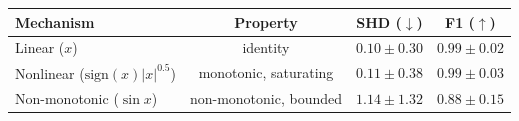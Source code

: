 \begin{tabular}{lccc}
\toprule
Mechanism & Property & SHD ($\downarrow$) & F1 ($\uparrow$) \\
\midrule
Linear ($x$) & identity & $0.10 \pm 0.30$ & $0.99 \pm 0.02$ \\
Nonlinear ($\text{sign}(x)|x|^{0.5}$) & monotonic, saturating & $0.11 \pm 0.38$ & $0.99 \pm 0.03$ \\
Non-monotonic ($\sin x$) & non-monotonic, bounded & $1.14 \pm 1.32$ & $0.88 \pm 0.15$ \\
\bottomrule
\end{tabular}
